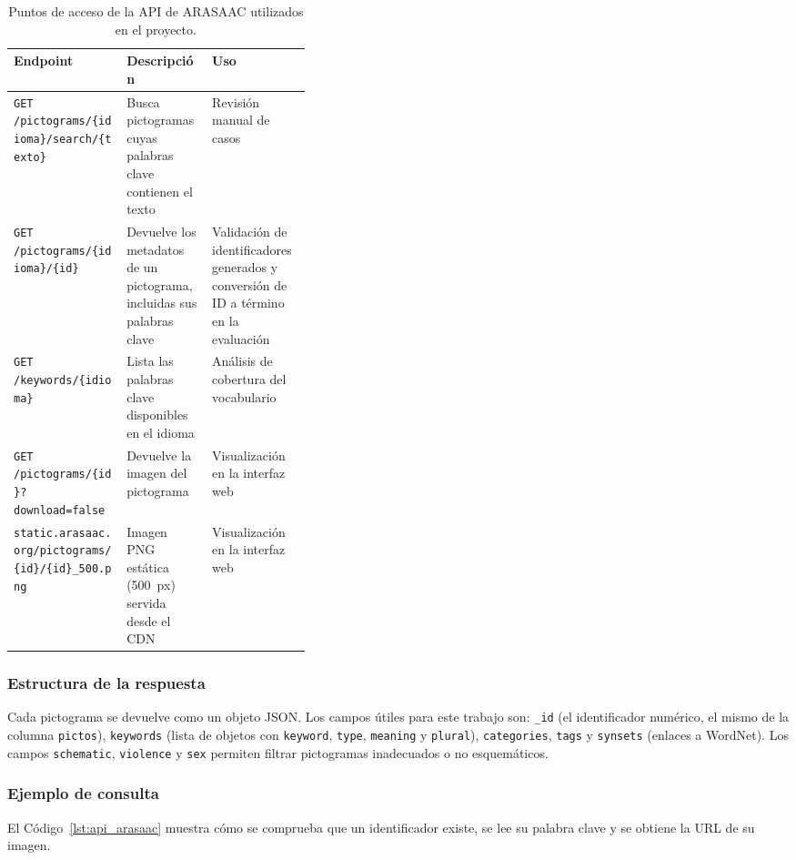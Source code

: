 \begin{table}[htbp]
\centering
\caption{Puntos de acceso de la API de ARASAAC utilizados en el proyecto.}
\label{tab:api_arasaac}
\small
\renewcommand{\arraystretch}{1.25}
\begin{tabularx}{\linewidth}{@{}
  >{\raggedright\arraybackslash}p{0.38\linewidth}
  >{\raggedright\arraybackslash}X
  >{\raggedright\arraybackslash}X@{}}
\toprule
\textbf{Endpoint} & \textbf{Descripción} & \textbf{Uso} \\
\midrule
\texttt{\footnotesize GET /pictograms/\allowbreak\{idioma\}/\allowbreak search/\allowbreak\{texto\}} &
Busca pictogramas cuyas palabras clave contienen el texto &
Revisión manual de casos \\
\addlinespace
\texttt{\footnotesize GET /pictograms/\allowbreak\{idioma\}/\allowbreak\{id\}} &
Devuelve los metadatos de un pictograma, incluidas sus palabras clave &
Validación de identificadores generados y conversión de ID a término en la evaluación \\
\addlinespace
\texttt{\footnotesize GET /keywords/\allowbreak\{idioma\}} &
Lista las palabras clave disponibles en el idioma &
Análisis de cobertura del vocabulario \\
\addlinespace
\texttt{\footnotesize GET /pictograms/\allowbreak\{id\}?\allowbreak download=\allowbreak false} &
Devuelve la imagen del pictograma &
Visualización en la interfaz web \\
\addlinespace
\texttt{\footnotesize static.arasaac.org/\allowbreak pictograms/\allowbreak\{id\}/\allowbreak\{id\}\_500.png} &
Imagen PNG estática (500~px) servida desde el CDN &
Visualización en la interfaz web \\
\bottomrule
\end{tabularx}
\end{table}

\subsubsection{Estructura de la respuesta}
Cada pictograma se devuelve como un objeto JSON. Los campos útiles para este trabajo son: \texttt{\_id} (el identificador numérico, el mismo de la columna \texttt{pictos}), \texttt{keywords} (lista de objetos con \texttt{keyword}, \texttt{type}, \texttt{meaning} y \texttt{plural}), \texttt{categories}, \texttt{tags} y \texttt{synsets} (enlaces a WordNet). Los campos \texttt{schematic}, \texttt{violence} y \texttt{sex} permiten filtrar pictogramas inadecuados o no esquemáticos.
\subsubsection{Ejemplo de consulta}
El Código~\ref{lst:api_arasaac} muestra cómo se comprueba que un identificador existe, se lee su palabra clave y se obtiene la URL de su imagen.

